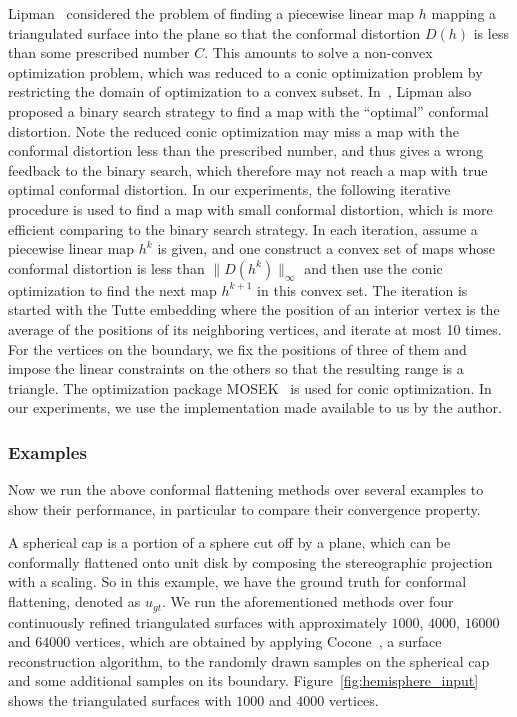 \documentclass[11pt]{article}
\begin{document}
\vspace{0.1in}
Lipman~\cite{Lipman12} considered the problem of finding a piecewise linear map $h$ mapping
a triangulated surface into the plane so that the conformal distortion $D(h)$ is less than 
some prescribed number $C$. This amounts to solve a non-convex optimization problem, 
which was reduced to a conic optimization problem by restricting the domain of optimization
to a convex subset. In~\cite{Lipman12}, Lipman also proposed a binary search strategy to find
a map with the ``optimal'' conformal distortion. Note the reduced conic optimization may miss
a map with the conformal distortion less than the prescribed number, and thus gives a wrong 
feedback to the binary search, which therefore may not reach a map with true
optimal conformal distortion. In our experiments, the following iterative procedure is used to 
find a map with small conformal distortion, which is more efficient comparing to 
the binary search strategy. In each iteration, assume a piecewise linear map $h^k$ is given,
and one construct a convex set of maps whose conformal distortion is less than 
$\|D(h^k)\|_\infty$ and then use the conic optimization to find the next map $h^{k+1}$ 
in this convex set.  The iteration is started with the Tutte embedding where the position 
of an interior vertex is the average of the positions of its neighboring vertices, and 
iterate at most 10 times. For the vertices on the boundary, we fix the positions of 
three of them and impose the linear constraints on the others so that the resulting 
range is a triangle. The optimization package MOSEK~\cite{mosek} is used for conic optimization. 
In our experiments, we use the implementation made available to us by the author. 


\subsubsection{Examples}
Now we run the above conformal flattening methods over several examples to show their performance, in particular
to compare their convergence property.  

\vspace{0.1in}
 A spherical cap is a portion of a sphere cut off by a plane, which can be
conformally flattened onto unit disk by composing the stereographic projection with a scaling. So in this 
example, we have the ground truth for conformal flattening, denoted as $u_{gt}$. We run the aforementioned 
methods over four continuously refined triangulated surfaces with approximately $1000$, $4000$, $16000$ and $64000$ vertices, 
which are obtained by applying Cocone~\cite{Amenta00asimple}, a surface reconstruction algorithm, to the randomly drawn samples 
on the spherical cap and some additional samples on its boundary. Figure~\ref{fig:hemisphere_input} shows the triangulated surfaces
with $1000$ and $4000$ vertices.  
\end{document}
